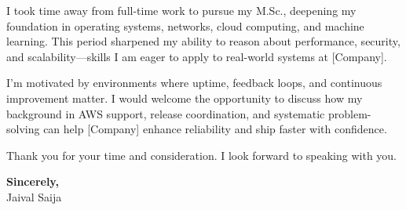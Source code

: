 \documentclass[11pt,a4paper]{article}
\begin{document}
I took time away from full-time work to pursue my M.Sc., deepening my foundation in operating systems, networks, cloud computing, and machine learning. This period sharpened my ability to reason about performance, security, and scalability—skills I am eager to apply to real-world systems at [Company].

I'm motivated by environments where uptime, feedback loops, and continuous improvement matter. I would welcome the opportunity to discuss how my background in AWS support, release coordination, and systematic problem-solving can help [Company] enhance reliability and ship faster with confidence.

Thank you for your time and consideration. I look forward to speaking with you.

\textbf{Sincerely,} \\
Jaival Saija
\end{document}
